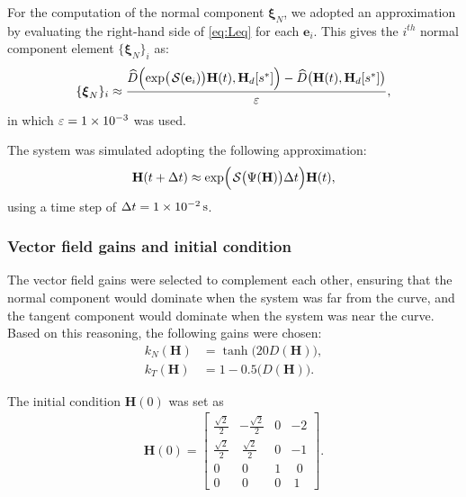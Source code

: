 For the computation of the normal component $\boldsymbol{\xi}_N$, we adopted an approximation by evaluating the right-hand side of \eqref{eq:Leq} for each $\mathbf{e}_i$. This gives the $i^{th}$ normal component element $\{\boldsymbol{\xi}_{N}\}_{i}$ as:
\begin{align}
    \{\boldsymbol{\xi}_{N}\}_{i} \approx \frac{\widehat{D}\Bigl(\exp\bigl(\SL[\boldsymbol{\mathbf{e}}_i]\bigr)\mathbf{H}(t), \mathbf{H}_d[s^*]\Bigr) - \widehat{D}\bigl(\mathbf{H}(t), \mathbf{H}_d[s^*]\bigr)}{\varepsilon},
\end{align} 
in which $\varepsilon = \num{1E-3}$ was used.

The system was simulated adopting the following approximation:
\begin{align}
    \mathbf{H}(t + \Delta t) \approx \exp\Bigl(\SL\bigl(\Psi(\mathbf{H})\bigr)\Delta t\Bigr)\mathbf{H}(t),
\end{align}
using a time step of $\Delta t = \qty{1E-2}{\second}$. 
\subsubsection{Vector field gains and initial condition}
The vector field gains were selected to complement each other, ensuring that the normal component would dominate when the system was far from the curve, and the tangent component would dominate when the system was near the curve. Based on this reasoning, the following gains were chosen:
\begin{align}
    k_N(\mathbf{H}) &= \tanh\bigl(20D(\mathbf{H})\bigr),\\
    k_T(\mathbf{H}) &= 1 - 0.5\bigl(D(\mathbf{H})\bigr).
\end{align}

The initial condition $\mathbf{H}(0)$ was set as
\begin{align}
    \mathbf{H}(0) = \begin{bmatrix}
        \frac{\sqrt{2}}{2} & -\frac{\sqrt{2}}{2} & 0 & -2\\
        \frac{\sqrt{2}}{2} & \ \frac{\sqrt{2}}{2} & 0 & -1\\
        0 & \ 0 & 1 & \ \ 0\\
        0 & \ 0 & 0 & \ 1
    \end{bmatrix}.
\end{align}
